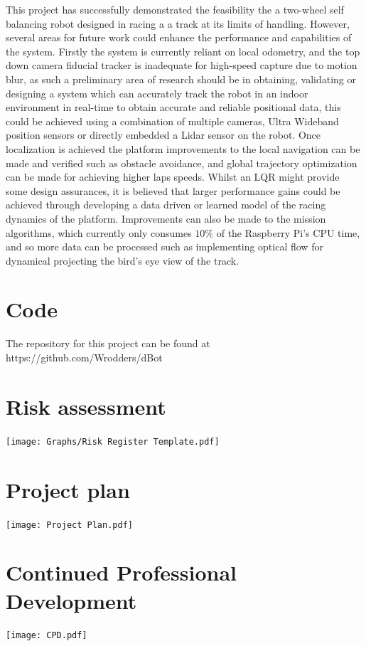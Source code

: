     This project has successfully demonstrated the feasibility the a two-wheel self balancing robot designed in racing a a track at its limits of handling. 
    However, several areas for future work could enhance the performance and capabilities of the system. Firstly the system is currently reliant 
    on local odometry, and the top down camera fiducial tracker is inadequate for high-speed capture due to motion blur, as such a preliminary area of research 
    should be in obtaining, validating or designing a system which can accurately track the robot in an indoor environment in real-time to obtain accurate and reliable positional 
    data, this could be achieved using a combination of multiple cameras, Ultra Wideband position sensors or directly embedded a Lidar sensor on the robot. Once localization is achieved 
    the platform improvements to the local navigation can be made and verified such as obstacle avoidance, and global trajectory optimization can be made for achieving higher laps speeds. 
    Whilst an LQR might provide some design assurances, it is believed that larger performance gains could be achieved through developing a data driven or 
    learned model of the racing dynamics of the platform. Improvements can also be made to the mission algorithms, which currently only consumes $10\%$ of the Raspberry Pi's CPU time, 
    and so more data can be processed such as implementing optical flow for dynamical projecting the bird's eye view of the track.


    \printbibliography
  \begin{uomappendix} 
      \section{Code}
      The repository for this project can be found at 
      https://github.com/Wrodders/dBot
      \section{Risk assessment}
    \texttt{[image: Graphs/Risk Register Template.pdf]}
    \section{Project plan}
    \texttt{[image: Project Plan.pdf]}
    \section{Continued Professional Development}
    \texttt{[image: CPD.pdf]}
      
  \end{uomappendix}


  
  